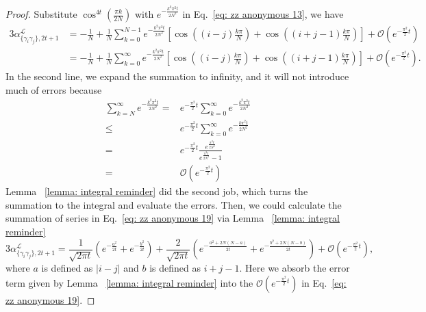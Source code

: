 \documentclass{article}
\newcommand{\alpl}{\alpha_{\{\gamma_i\gamma_j\}, 2t+1}^{\mathscr{L}}}
\begin{document}
\begin{proof}
Substitute $\cos ^{4 t}\left(\frac{\pi k}{2 N}\right)$ with $e^{-\frac{k^2 \pi^2 t}{2N^2}}$ in Eq.~\eqref{eq: zz anonymous 13}, we have 
\begin{align}
3\alpl& =-\frac{1}{N}+\frac{1}{N} \sum_{k=0}^{N-1} e^{-\frac{k^2 \pi^2 t}{2 N^2}}\left[\cos \left((i-j) \frac{k \pi}{N}\right)+\cos \left((i+j-1) \frac{k \pi}{N}\right)\right]+\mathcal{O}\left(e^{-\frac{\pi^2}{2}t}\right)\\
& =-\frac{1}{N}+\frac{1}{N} \sum_{k=0}^{\infty}e^{-\frac{k^2 \pi^2 t}{2 N^2}}\left[\cos \left((i-j) \frac{k \pi}{N}\right)+\cos \left((i+j-1) \frac{k \pi}{N}\right)\right]+\mathcal{O}\left(e^{-\frac{\pi^2}{2}t}\right).
\label{eq: zz anonymous 19}
\end{align}
In the second line, we expand the summation to infinity, and it will not introduce much of errors because 
\begin{align*}
    \sum_{k=N}^{\infty} e^{-\frac{k^2 \pi^2 t}{2 N^2}} =& e^{-\frac{\pi^2}{2}t}\sum_{k=0}^{\infty} e^{-\frac{k^2 \pi^2 t}{2 N^2}} \\
    \leq& e^{-\frac{\pi^2}{2}t}\sum_{k=0}^{\infty} e^{-\frac{k \pi^2 t}{2 N^2}} \\
    =& e^{-\frac{\pi^2}{2}t} \frac{e^{\frac{\pi^2 t}{2 N^2}}}{e^{\frac{\pi^2 t}{2 N^2}} -1 } \\
    =& \mathcal{O}\left(e^{-\frac{\pi^2}{2}t}\right)
\end{align*}
Lemma ~\ref{lemma: integral reminder} did the second job, which turns the summation to the integral and evaluate the errors. Then, we could calculate the summation of series in Eq.~\eqref{eq: zz anonymous 19} via Lemma ~\ref{lemma: integral reminder}
\begin{equation}
    3\alpl = \frac{1}{\sqrt{2\pi t}} (e^{-\frac{a^2}{2t}}+ e^{-\frac{b^2}{2t}})
    + \frac{2}{\sqrt{2\pi t}}(e^{-\frac{a^2+2N(N-a)}{2t}}+ e^{-\frac{b^2+2N(N-b)}{2t}}) + \mathcal{O}\left(e^{-\frac{\pi^2}{2}t}\right),
\end{equation}
where $a$ is defined as $|i-j|$ and $b$ is defined as $i+j-1$. Here we absorb the error term given by Lemma ~\ref{lemma: integral reminder} into the $\mathcal{O}\left(e^{-\frac{\pi^2}{2}t}\right)$ in Eq.~\eqref{eq: zz anonymous 19}.


\end{proof}
\end{document}
